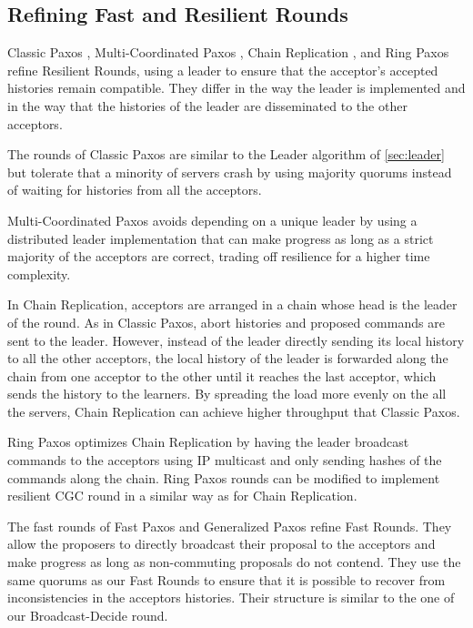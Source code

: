 \documentclass{llncs}
\begin{document}
\subsection{Refining Fast and Resilient Rounds}

Classic Paxos \cite{lamport2001paxos}, Multi-Coordinated Paxos \cite{CamargosSchmidtPedone07MulticoordinatedPaxos}, Chain Replication \cite{RenesseSchneider04ChainReplicationSupportingHighThroughputAvailability}, and Ring Paxos \cite{MarandiETAL10RingPaxosHighthroughputAtomicBroadcastProtocol} refine Resilient Rounds, using a leader to ensure that the acceptor's accepted histories remain compatible. They differ in the way the leader is
implemented and in the way that the histories of the leader are disseminated to
the other acceptors.

The rounds of Classic Paxos are similar to the Leader algorithm of \cref{sec:leader} but
tolerate that a minority of servers crash by using majority quorums instead of
waiting for histories from all the acceptors.

Multi-Coordinated Paxos avoids depending on a unique leader by using a
distributed leader implementation that can make progress as long as a strict
majority of the acceptors are correct, trading off resilience for a higher time
complexity.

In Chain Replication, acceptors are arranged in a chain whose head is
the leader of the round. As in Classic Paxos, abort histories and
proposed commands are sent to the leader. However, instead of the
leader directly sending its local history to all the other acceptors,
the local history of the leader is
forwarded along the chain from one acceptor to the other until it
reaches the last acceptor, which sends the history to the learners. 
By spreading the load more evenly on the all the servers, Chain Replication
can achieve higher throughput that Classic Paxos.

Ring Paxos optimizes Chain Replication by having the leader broadcast
commands to the acceptors using IP multicast and only sending hashes
of the commands along the chain. Ring Paxos rounds can be modified to implement
resilient CGC round in a similar way as for Chain Replication.

The fast rounds of Fast Paxos \cite{Lamport06FastPaxos} and Generalized Paxos \cite{Lamport05GeneralizeConsensus} refine Fast Rounds.
They allow the proposers to directly broadcast their proposal to the 
acceptors and make progress as long as non-commuting proposals do not contend.
They use the same quorums as our Fast Rounds to ensure that it is possible to recover from inconsistencies 
in the acceptors histories.
Their structure is similar to the one of our Broadcast-Decide round.
\end{document}
